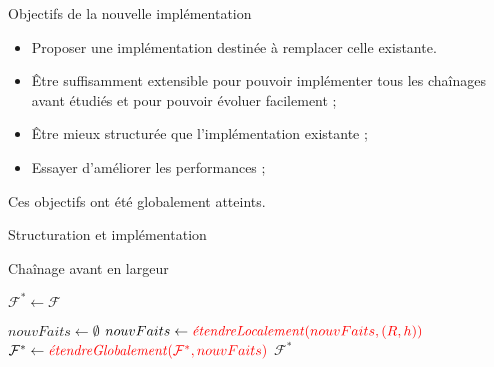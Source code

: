\begin{frame}{Objectifs de la nouvelle implémentation}
    \begin{itemize}
        \item Proposer une implémentation destinée à remplacer celle existante.
        \item Être suffisamment extensible pour pouvoir implémenter tous les chaînages avant étudiés et pour pouvoir évoluer facilement ;
        \item Être mieux structurée que l'implémentation existante ;
        \item Essayer d'améliorer les performances ;
    \end{itemize}
    Ces objectifs ont été globalement atteints.
\end{frame}

\begin{frame}{Structuration et implémentation}

\begin{algorithm}[H]\label{algo:chainage_avant_largeur}
\caption{Chaînage avant en largeur}
\SetAlgoLined
\DontPrintSemicolon
{\footnotesize
{}

$\mathcal{F}^* \gets \mathcal{F}$\;

{
    $nouvFaits\gets \emptyset$ \;
    {
        {
            \uIf{$\textcolor{blue}{estApplicable(R,h)}$}
            {
                $nouvFaits \leftarrow \textcolor{red}{\mbox{\textit{étendreLocalement}}(nouvFaits, (R,h))}$\;
            }
        }
    }
    $\mathcal{F}^*\gets \textcolor{red}{\mbox{\textit{étendreGlobalement}}(\mathcal{F}^*, nouvFaits)}$\;
}
\Return $\mathcal{F}^*$
}
\end{algorithm}
     
\end{frame}